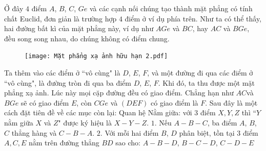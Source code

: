 \begin{multicols}{2}
	Ở đây $4$ điểm $A$, $B$, $C$, $Ge$ và các cạnh nối chúng tạo thành mặt phẳng có tính chất Euclid, đơn giản là trường hợp $4$ điểm ở ví dụ phía trên. 
	Như ta có thể thấy, hai đường bất kì của mặt phẳng này, ví dụ như $AGe$ và $BC$, hay $AC$ và $BGe$, đều song song nhau, do chúng không có điểm chung. 
	\begin{figure}[H]
		\vspace*{-5pt}
		\centering
		\captionsetup{labelformat= empty, justification=centering}
		\texttt{[image: Mặt phẳng xạ ảnh hữu hạn 2.pdf]}
		\vspace*{-10pt}
	\end{figure}
	Ta thêm vào các điểm ở ``vô cùng" là $D$, $E$, $F$, và một đường đi qua các điểm ở ``vô cùng", là đường tròn đi qua ba điểm $D$, $E$, $F$. Khi đó, ta thu được một mặt phẳng xạ ảnh. Lúc này mọi cặp đường đều có giao điểm. Chẳng hạn như $AC$và $BGe$ sẽ có giao điểm $E$, còn $CGe$ và $(DEF)$ có giao điểm là $F$.
	\vskip 0.1cm
	Sau đây là một cách đặt tiên đề về các mục còn lại: 
	\vskip 0.1cm
	Quan hệ Nằm giữa: với $3$ điểm $X, Y, Z$ thì ``$Y$ nằm giữa $X$ và $Z$" được ký hiệu là $X-Y-Z$.
	\vskip 0.1cm
	$1.$ Nếu $A - B - C$, ba điểm $A$, $B$, $C$ thẳng hàng và $C - B - A$.
	\vskip 0.1cm
	$2.$ Với mỗi hai điểm $B$, $D$ phân biệt, tồn tại $3$ điểm $A, C, E$ nằm trên đường thẳng $BD$ sao cho: $A - B - D$, $B - C - D$, $C - D - E$ 

\end{multicols}
